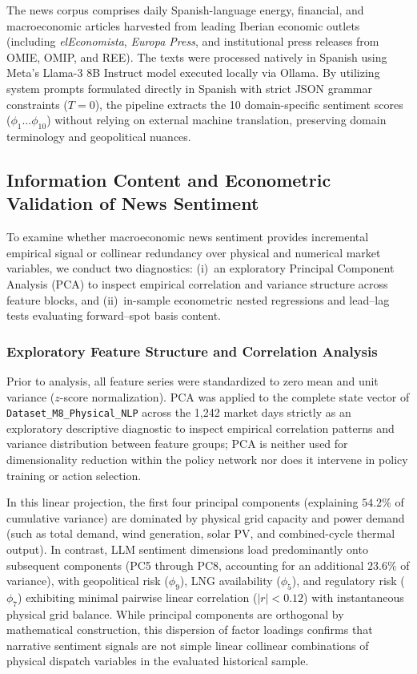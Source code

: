The news corpus comprises daily Spanish-language energy, financial, and macroeconomic articles harvested from leading Iberian economic outlets (including \textit{elEconomista}, \textit{Europa Press}, and institutional press releases from OMIE, OMIP, and REE). The texts were processed natively in Spanish using Meta's Llama-3 8B Instruct model \cite{dubey2024llama3} executed locally via Ollama. By utilizing system prompts formulated directly in Spanish with strict JSON grammar constraints ($T=0$), the pipeline extracts the 10 domain-specific sentiment scores ($\phi_1 \dots \phi_{10}$) without relying on external machine translation, preserving domain terminology and geopolitical nuances.

\subsection{Information Content and Econometric Validation of News Sentiment}
\label{subsec:feature_importance}

To examine whether macroeconomic news sentiment provides incremental empirical signal or collinear redundancy over physical and numerical market variables, we conduct two diagnostics: (i)~an exploratory Principal Component Analysis (PCA) \cite{hastie2009elements} to inspect empirical correlation and variance structure across feature blocks, and (ii)~in-sample econometric nested regressions and lead--lag tests evaluating forward--spot basis content.

\subsubsection{Exploratory Feature Structure and Correlation Analysis}

Prior to analysis, all feature series were standardized to zero mean and unit variance ($z$-score normalization). PCA was applied to the complete state vector of \texttt{Dataset\_M8\_Physical\_NLP} across the 1,242 market days strictly as an exploratory descriptive diagnostic to inspect empirical correlation patterns and variance distribution between feature groups; PCA is neither used for dimensionality reduction within the policy network nor does it intervene in policy training or action selection.

In this linear projection, the first four principal components (explaining $54.2\%$ of cumulative variance) are dominated by physical grid capacity and power demand (such as total demand, wind generation, solar PV, and combined-cycle thermal output). In contrast, LLM sentiment dimensions load predominantly onto subsequent components (PC5 through PC8, accounting for an additional $23.6\%$ of variance), with geopolitical risk ($\phi_9$), LNG availability ($\phi_5$), and regulatory risk ($\phi_7$) exhibiting minimal pairwise linear correlation ($|r| < 0.12$) with instantaneous physical grid balance. While principal components are orthogonal by mathematical construction, this dispersion of factor loadings confirms that narrative sentiment signals are not simple linear collinear combinations of physical dispatch variables in the evaluated historical sample.

